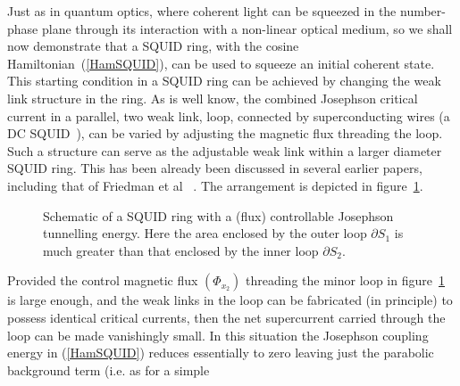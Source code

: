 \documentclass[twocolumn,a4paper,superscriptaddress,showpacs,floatfix,pra]{revtex4}
\begin{document}
Just as in quantum optics, where coherent light can be squeezed in the
number-phase plane  through its interaction with  a non-linear optical
medium, so we shall now demonstrate that a SQUID ring, with the cosine
Hamiltonian~(\ref{HamSQUID}),  can  be  used  to  squeeze  an  initial
coherent  state.  This starting  condition  in  a  SQUID ring  can  be
achieved by changing  the weak link structure in the  ring. As is well
know, the combined Josephson critical  current in a parallel, two weak
link,    loop,   connected    by   superconducting    wires    (a   DC
SQUID~\cite{Likharev86}), can be varied by adjusting the magnetic flux
threading the loop. Such a  structure can serve as the adjustable weak
link within a  larger diameter SQUID ring. This  has been already been
discussed in several earlier papers,  including that of Friedman et al
~\cite{FriedmanPCTL00}.    The     arrangement    is    depicted    in
figure~\ref{fb6}.
\begin{figure}[!t]
\begin{center}
\end{center}
\caption{  Schematic  of  a  SQUID  ring with  a  (flux)  controllable
Josephson tunnelling energy. Here the  area enclosed by the outer loop
$\partial S_{1}$ is much greater  than that enclosed by the inner loop
$\partial S_{2}$. }
\label{fb6}
\end{figure}
Provided  the control  magnetic  flux $\left(  \Phi _{x_{2}}\right)  $
threading the minor loop in  figure~\ref{fb6} is large enough, and the
weak links  in the  loop can be  fabricated (in principle)  to possess
identical critical currents, then the net supercurrent carried through
the  loop  can  be  made  vanishingly small.  In  this  situation  the
Josephson coupling  energy in (\ref{HamSQUID})  reduces essentially to
zero leaving just the parabolic  background term (i.e. as for a simple
\end{document}
